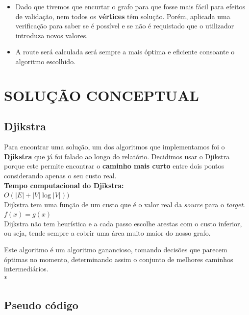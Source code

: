 \documentclass[a4paper]{article}
\begin{document}
\begin{itemize}
    \item Dado que tivemos que encurtar o grafo para que fosse mais fácil para efeitos de validação, nem todos os \textbf{vértices} têm solução. Porém,  aplicada uma verificação para saber se é possível e se não é requistado que o utilizador introduza novos valores.
    
    \item A route será calculada será sempre a mais óptima e eficiente consoante o algoritmo escolhido.
\end{itemize}

\setcounter{secnumdepth}{0}
\section{SOLUÇÃO CONCEPTUAL}

\subsection{Djikstra}


Para encontrar uma solução, um dos algoritmos que implementamos foi o \textbf{Djikstra} que já foi falado ao longo do relatório. Decidimos usar o Djikstra porque este permite encontrar o \textbf{caminho mais curto} entre dois pontos considerando apenas o seu custo real. \\


\textbf{Tempo computacional do Djikstra:}\\

 $O\left ( \left | E \right | + \left | V \right |  \log \left | V \right | \right ))$\\

Dijkstra tem uma função de um custo que é o valor real da \textit{source} para o \textit{target}. \\

 $f(x) = g(x)$ \\


Dijkstra não tem heurística e a cada passo escolhe arestas com o custo inferior, ou seja, tende sempre a cobrir uma área muito maior do nosso grafo. 

Este algoritmo é um algoritmo ganancioso, tomando decisões que parecem óptimas no momento, determinando assim o conjunto de melhores caminhos intermediários. \\*



\subsection{Pseudo código}
\end{document}
